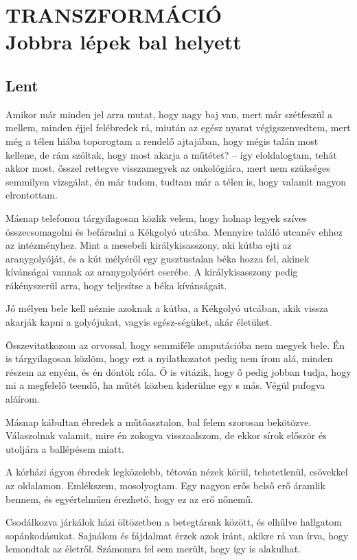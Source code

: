 \clearpage
\chapter{TRANSZFORMÁCIÓ \\ Jobbra lépek bal helyett}

\section{Lent}

Amikor már minden jel arra mutat, hogy nagy baj van, mert már szétfeszül
a mellem, minden éjjel felébredek rá, miután az egész nyarat
végigszenvedtem, mert még a télen hiába toporogtam a rendelő ajtajában,
hogy mégis talán most kellene, de rám szóltak, hogy most akarja a
műtétet? -- így eloldalogtam, tehát akkor most, ősszel rettegve visszamegyek
az onkológiára, mert nem szükséges semmilyen vizsgálat, én
már tudom, tudtam már a télen is, hogy valamit nagyon elrontottam.

Másnap telefonon tárgyilagosan közlik velem, hogy holnap legyek
szíves összecsomagolni és befáradni a Kékgolyó utcába. Mennyire
találó utcanév ehhez az intézményhez. Mint a mesebeli királykisasszony,
aki kútba ejti az aranygolyóját, és a kút mélyéről egy gusztustalan
béka hozza fel, akinek kívánságai vannak az aranygolyóért cserébe.
A királykisasszony pedig rákényszerül arra, hogy teljesítse a béka
kívánságait.

Jó mélyen bele kell néznie azoknak a kútba, a Kékgolyó utcában, akik
vissza akarják kapni a golyójukat, vagyis egész-ségüket, akár életüket.

Összevitatkozom az orvossal, hogy semmiféle amputációba nem
megyek bele. Én is tárgyilagosan közlöm, hogy ezt a nyilatkozatot
pedig nem írom alá, minden részem az enyém, és én döntök róla. Ő is
vitázik, hogy ő pedig jobban tudja, hogy mi a megfelelő teendő, ha műtét
közben kiderülne egy s más. Végül pufogva aláírom.

Másnap kábultan ébredek a műtőasztalon, bal felem szorosan bekötözve.
Válaszolnak valamit, mire én zokogva visszaalszom, de ekkor
sírok először és utoljára a ballépésem miatt.

A kórházi ágyon ébredek legközelebb, tétován nézek körül, tehetetlenül,
csövekkel az oldalamon. Emlékszem, mosolyogtam. Egy nagyon
erős belső erő áramlik bennem, és egyértelműen érezhető, hogy ez az
erő nőnemű.

Csodálkozva járkálok házi öltözetben a betegtársak között, és elhűlve
hallgatom sopánkodásukat. Sajnálom és fájdalmat érzek azok
iránt, akikre rá van írva, hogy lemondtak az életről. Számomra fel sem
merült, hogy így is alakulhat.

